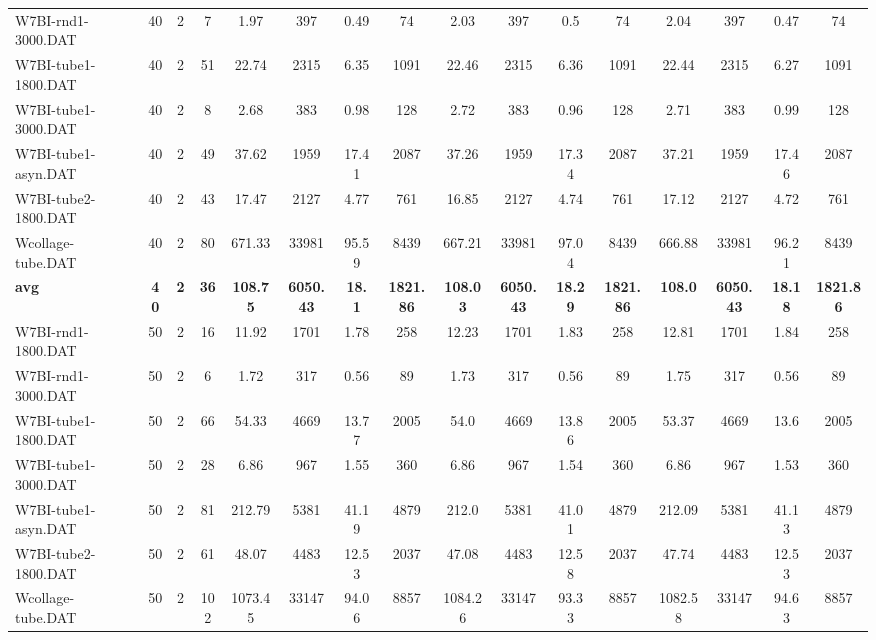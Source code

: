 \begin{sidewaystable}[!ht]
{\begin{tabular}{lccccccccccccccc}
W7BI-rnd1-3000.DAT & 40 & 2 & 7 & 1.97 & 397 & 0.49 & 74 & 2.03 & 397 & 0.5 & 74 & 2.04 & 397 &  \textcolor{blue2}{0.47} & 74 \\
W7BI-tube1-1800.DAT & 40 & 2 & 51 & 22.74 & 2315 & 6.35 & 1091 & 22.46 & 2315 & 6.36 & 1091 & 22.44 & 2315 &  \textcolor{blue2}{6.27} & 1091 \\
W7BI-tube1-3000.DAT & 40 & 2 & 8 & 2.68 & 383 & 0.98 & 128 & 2.72 & 383 &  \textcolor{blue2}{0.96} & 128 & 2.71 & 383 & 0.99 & 128 \\
W7BI-tube1-asyn.DAT & 40 & 2 & 49 & 37.62 & 1959 & 17.41 & 2087 & 37.26 & 1959 &  \textcolor{blue2}{17.34} & 2087 & 37.21 & 1959 & 17.46 & 2087 \\
W7BI-tube2-1800.DAT & 40 & 2 & 43 & 17.47 & 2127 & 4.77 & 761 & 16.85 & 2127 & 4.74 & 761 & 17.12 & 2127 &  \textcolor{blue2}{4.72} & 761 \\
Wcollage-tube.DAT & 40 & 2 & 80 & 671.33 & 33981 &  \textcolor{blue2}{95.59} & 8439 & 667.21 & 33981 & 97.04 & 8439 & 666.88 & 33981 & 96.21 & 8439 \\
\cline{1-16} \textbf{avg} & \textbf{40} & \textbf{2} & \textbf{36} & \textbf{108.75} & \textbf{6050.43} & \textbf{18.1} & \textbf{1821.86} & \textbf{108.03} & \textbf{6050.43} & \textbf{18.29} & \textbf{1821.86} & \textbf{108.0} & \textbf{6050.43} & \textbf{18.18} & \textbf{1821.86} \\ \cline{1-16}
W7BI-rnd1-1800.DAT & 50 & 2 & 16 & 11.92 & 1701 &  \textcolor{blue2}{1.78} & 258 & 12.23 & 1701 & 1.83 & 258 & 12.81 & 1701 & 1.84 & 258 \\
W7BI-rnd1-3000.DAT & 50 & 2 & 6 & 1.72 & 317 &  \textcolor{blue2}{0.56} & 89 & 1.73 & 317 &  \textcolor{blue2}{0.56} & 89 & 1.75 & 317 &  \textcolor{blue2}{0.56} & 89 \\
W7BI-tube1-1800.DAT & 50 & 2 & 66 & 54.33 & 4669 & 13.77 & 2005 & 54.0 & 4669 & 13.86 & 2005 & 53.37 & 4669 &  \textcolor{blue2}{13.6} & 2005 \\
W7BI-tube1-3000.DAT & 50 & 2 & 28 & 6.86 & 967 & 1.55 & 360 & 6.86 & 967 & 1.54 & 360 & 6.86 & 967 &  \textcolor{blue2}{1.53} & 360 \\
W7BI-tube1-asyn.DAT & 50 & 2 & 81 & 212.79 & 5381 & 41.19 & 4879 & 212.0 & 5381 &  \textcolor{blue2}{41.01} & 4879 & 212.09 & 5381 & 41.13 & 4879 \\
W7BI-tube2-1800.DAT & 50 & 2 & 61 & 48.07 & 4483 &  \textcolor{blue2}{12.53} & 2037 & 47.08 & 4483 & 12.58 & 2037 & 47.74 & 4483 &  \textcolor{blue2}{12.53} & 2037 \\
Wcollage-tube.DAT & 50 & 2 & 102 & 1073.45 & 33147 & 94.06 & 8857 & 1084.26 & 33147 &  \textcolor{blue2}{93.33} & 8857 & 1082.58 & 33147 & 94.63 & 8857 \\

\end{tabular}}
\end{sidewaystable}
